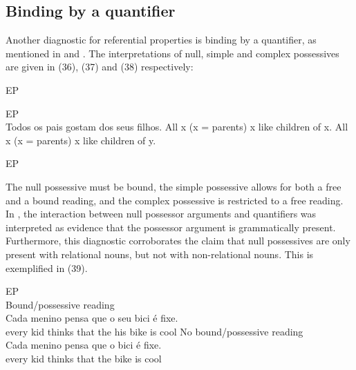 \documentclass[output=paper]{langsci/langscibook}
\begin{document}
\subsection{Binding by a quantifier}%

Another diagnostic for referential properties is binding by a quantifier, as mentioned in \citet{Barker2011} and \citet{MateusEtAl2003}. The interpretations of null, simple and complex possessives are given in (36), (37) and (38) respectively:

\ea%
    EP\label{ex:wein:36}\\
    \z
\z    

\ea%
        EP\label{ex:wein:37}\\
    \ea Todos os pais gostam dos seus filhos.
    \ex All x (x = parents) x like children of x.
    \ex All x (x = parents) x like children of y.
    \z  
\z


\ea%
    EP\label{ex:wein:38}\\
    \z
\z

The null possessive must be bound, the simple possessive allows for both a free and a bound reading, and the complex possessive is restricted to a free reading. In \citet[1112]{Barker2011}, the interaction between null possessor arguments and quantifiers was interpreted as evidence that the possessor argument is grammatically present. Furthermore, this diagnostic corroborates the claim that null possessives are only present with relational nouns, but not with non-relational nouns. This is exemplified in (39).

\ea%
    EP\label{ex:wein:39}\\
    \ea
    \gll Bound/possessive reading\\
         Cada menino pensa que o seu bici é fixe.\\
    \glt every kid thinks that the his bike is cool
    \ex  
    \gll No bound/possessive reading\\
         Cada menino pensa que o bici é fixe.\\
    \glt every kid thinks that the bike is cool
    \z
\z
\end{document}
